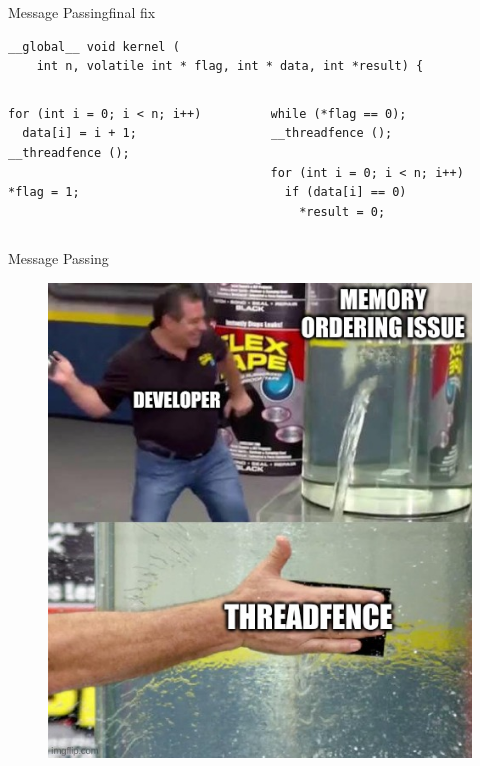 \documentclass[aspectratio=169,compress]{beamer}
\begin{document}
\begin{frame}[fragile]{Message Passing}{final fix}
\centering
\begin{lstlisting}
__global__ void kernel (
    int n, volatile int * flag, int * data, int *result) { 
\end{lstlisting}

\begin{columns}[T]
	\begin{column}{0.45\textwidth}
\begin{lstlisting}[title={Writer}]
for (int i = 0; i < n; i++)
  data[i] = i + 1;
__threadfence ();

*flag = 1;
\end{lstlisting}
\end{column}

\begin{column}{0.45\textwidth}
\begin{lstlisting}[title={Reader}]
while (*flag == 0);
__threadfence ();

for (int i = 0; i < n; i++)
  if (data[i] == 0)
    *result = 0;
\end{lstlisting}
			\end{column}
	\end{columns}
\end{frame}

\begin{frame}[fragile]{Message Passing}{}
\centering
	\begin{figure}
		\includegraphics[trim=0 20 0 0,clip,height=0.9\textheight,keepaspectratio]{threadfence_meme.jpg}
	\end{figure}
\end{frame}
\end{document}
